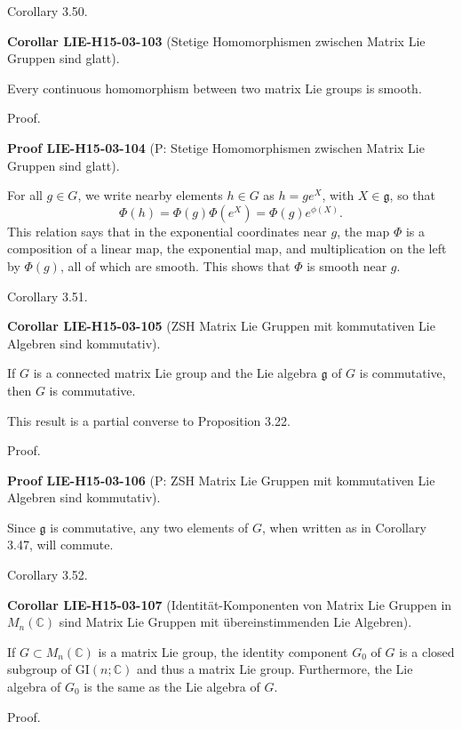 \documentclass[10pt, letterpaper]{article}
\newcommand{\C}{\mathbb{C}}
\newcommand{\CustomHeading}[3]{%
  \par\medskip\noindent%
  \textbf{#1 #2} \textnormal{(#3)}.\enskip%
}
\newenvironment{KORO}[2]{\begin{unitbox}\CustomHeading{Corollar}{#1}{#2}}{\end{unitbox}}
\newenvironment{PROOF}[2]{\begin{unitbox}\CustomHeading{Proof}{#1}{#2}}{\end{unitbox}}
\begin{document}
Corollary 3.50. 


\begin{KORO}{LIE-H15-03-103}{Stetige Homomorphismen zwischen Matrix Lie Gruppen sind glatt}
Every continuous homomorphism between two matrix Lie groups is smooth.
\end{KORO}

Proof. 

\begin{PROOF}{LIE-H15-03-104}{P: Stetige Homomorphismen zwischen Matrix Lie Gruppen sind glatt}
For all $g \in G$, we write nearby elements $h \in G$ as $h=g e^{X}$, with $X \in \mathfrak{g}$, so that
$$
\Phi(h)=\Phi(g) \Phi\left(e^{X}\right)=\Phi(g) e^{\phi(X)} .
$$
This relation says that in the exponential coordinates near $g$, the map $\Phi$ is a composition of a linear map, the exponential map, and multiplication on the left by $\Phi(g)$, all of which are smooth. This shows that $\Phi$ is smooth near $g$.
\end{PROOF}

Corollary 3.51. 

\begin{KORO}{LIE-H15-03-105}{ZSH Matrix Lie Gruppen mit kommutativen Lie Algebren sind kommutativ}
If $G$ is a connected matrix Lie group and the Lie algebra $\mathfrak{g}$ of $G$ is commutative, then $G$ is commutative.
\end{KORO}

This result is a partial converse to Proposition 3.22.


Proof. 

\begin{PROOF}{LIE-H15-03-106}{P: ZSH Matrix Lie Gruppen mit kommutativen Lie Algebren sind kommutativ}
Since $\mathfrak{g}$ is commutative, any two elements of $G$, when written as in Corollary 3.47, will commute.
\end{PROOF}

Corollary 3.52. 


\begin{KORO}{LIE-H15-03-107}{Identität-Komponenten von Matrix Lie Gruppen in $M_n(\C)$ sind Matrix Lie Gruppen mit übereinstimmenden Lie Algebren}
If $G \subset M_{n}(\mathbb{C})$ is a matrix Lie group, the identity component $G_{0}$ of $G$ is a closed subgroup of $\mathrm{GI}(n ; \mathbb{C})$ and thus a matrix Lie group. Furthermore, the Lie algebra of $G_{0}$ is the same as the Lie algebra of $G$.
\end{KORO}

Proof. 
\end{document}
